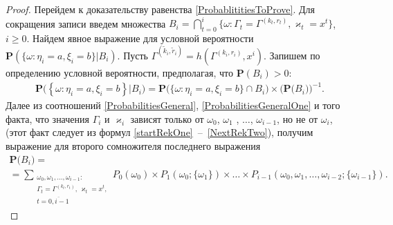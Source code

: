 \documentclass[a4paper,twoside]{article}
\theoremstyle{theorem}
\theoremstyle{remark}
\renewcommand{\Pr}{{\mathbf P}}
\begin{document}
\begin{proof}
Перейдем к доказательству равенства \eqref{ProbablititiesToProve}. Для сокращения записи введем множества $B_i = \bigcap_{t=0}^{i}\{\omega\colon \Gamma_t=\Gamma^{(k_t,r_t)}, \varkappa_t=x^t\}$, $i\geqslant 0$. Найдем явное выражение для условной вероятности $\Pr (\{ \omega \colon \eta_i = a, \xi_i=b\} | B_i)$. Пусть $\Gamma^{(\tilde{k}_i,\tilde{r}_i)}=h(\Gamma^{(k_i,r_i)},x^i)$. Запишем по определению условной вероятности, предполагая, что $\Pr(B_i)>0$:
\begin{multline}
\Pr \bigl(\left\{ \omega \colon \eta_i = a, \xi_i=b\right\}  |B_i\bigr) 
=\Pr\bigl(\{ \omega \colon \eta_i = a, \xi_i=b \} \cap B_i\bigr) 
\times
\bigl(\Pr\bigl( B_i\bigr)\bigr)^{-1}.
\label{Construction:1}
\end{multline}
Далее из соотношений \eqref{ProbabilitiesGeneral}, \eqref{ProbabilitiesGeneralOne} и того факта, что значения $\Gamma_i$ и $\varkappa_{i}$ зависят только от $\omega_0$, $\omega_1$ , $\ldots$, $\omega_{i-1}$, но не от $\omega_i$, (этот факт следует из формул \eqref{startRekOne}~--~\eqref{NextRekTwo}), получим выражение для второго сомножителя последнего выражения
\begin{multline}
\Pr\bigl( B_i\bigr)=\\
=\sum_{\substack{\omega_0, \omega_1,\ldots, \omega_{i-1} \colon \\ \Gamma_t=\Gamma^{(k_t,r_t)},\, \varkappa_t=x^t,\\ t=\overline{0,i-1}}} P_0(\omega_0)\times P_1(\omega_0;\{\omega_1\})\times\ldots\times P_{i-1}(\omega_0,\omega_1,\ldots, \omega_{i-2};\{\omega_{i-1}\}).
\label{Construction:2}
\end{multline}


\end{proof}
\end{document}
